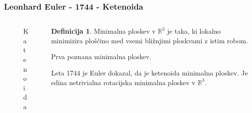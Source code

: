 \documentclass[8pt]{beamer}
\newcommand{\samplescalar}{5}  %
\theoremstyle{definition}
\newtheorem{definicija}{Definicija}
\theoremstyle{remark}
\theoremstyle{plain}
\numberwithin{equation}{section}  %
\begin{document}
\begin{frame}
    \frametitle{Leonhard Euler - 1744 - Ketenoida}
    \begin{columns}
        \begin{column}{0.5\textwidth}
            \centering
            \begin{figure}[H]
                \centering
            
                \caption{Katenoida}
            \end{figure}

        \end{column}

        \begin{column}{0.5\textwidth}
            \begin{definicija}
                Minimalna ploskev v $\mathbb{R}^3$ je taka, ki \textcolor{red1}{lokalno minimizira ploščino} med vsemi bližnjimi ploskvami z istim robom.
            \end{definicija}
            Prva poznana minimalna ploskev. 

            \vspace{0.8em}

            Leta 1744 je Euler dokazal, da je ketenoida minimalna ploskev. Je edina netrivialna \textcolor{red1}{rotacijska minimalna ploskev} v $\mathbb{R}^3$. 
            

\end{column}
\end{columns}
\end{frame}
\end{document}
